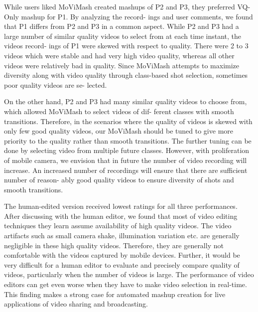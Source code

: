 \documentclass{sig-alternate}
\begin{document}
While users liked MoViMash created mashups of P2 and P3,
they preferred VQ-Only mashup for P1. By analyzing the record-
ings and user comments, we found that P1 differs from P2 and P3 in
a common aspect. While P2 and P3 had a large number of similar
quality videos to select from at each time instant, the videos record-
ings of P1 were skewed with respect to quality. There were 2 to 3
videos which were stable and had very high video quality, whereas
all other videos were relatively bad in quality. Since MoViMash
attempts to maximize diversity along with video quality through
class-based shot selection, sometimes poor quality videos are se-
lected.

On the other hand, P2 and P3 had many similar quality videos
to choose from, which allowed MoViMash to select videos of dif-
ferent classes with smooth transitions. Therefore, in the scenarios
where the quality of videos is skewed with only few good quality
videos, our MoViMash should be tuned to give more priority to
the quality rather than smooth transitions. The further tuning can
be done by selecting video from multiple future classes. However,
with proliferation of mobile camera, we envision that in future the
number of video recording will increase. An increased number of
recordings will ensure that there are sufficient number of reason-
ably good quality videos to ensure diversity of shots and smooth
transitions.

The human-edited version received lowest ratings for all three
performances. After discussing with the human editor, we found
that most of video editing techniques they learn assume availability
of high quality videos. The video artifacts such as small camera
shake, illumination variation etc. are generally negligible in these
high quality videos. Therefore, they are generally not comfortable
with the videos captured by mobile devices. Further, it would be
very difficult for a human editor to evaluate and precisely compare
quality of videos, particularly when the number of videos is large.
The performance of video editors can get even worse when they
have to make video selection in real-time. This finding makes a
strong case for automated mashup creation for live applications of
video sharing and broadcasting.
\end{document}
